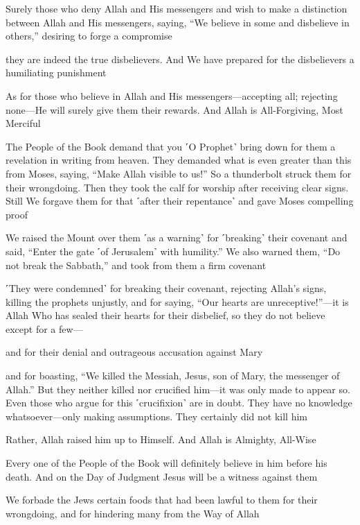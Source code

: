 Surely those who deny Allah and His messengers and wish to make a distinction between Allah and His messengers, saying, “We believe in some and disbelieve in others,” desiring to forge a compromise

they are indeed the true disbelievers. And We have prepared for the disbelievers a humiliating punishment

As for those who believe in Allah and His messengers—accepting all; rejecting none—He will surely give them their rewards. And Allah is All-Forgiving, Most Merciful

The People of the Book demand that you ˹O Prophet˺ bring down for them a revelation in writing from heaven. They demanded what is even greater than this from Moses, saying, “Make Allah visible to us!” So a thunderbolt struck them for their wrongdoing. Then they took the calf for worship after receiving clear signs. Still We forgave them for that ˹after their repentance˺ and gave Moses compelling proof

We raised the Mount over them ˹as a warning˺ for ˹breaking˺ their covenant and said, “Enter the gate ˹of Jerusalem˺ with humility.” We also warned them, “Do not break the Sabbath,” and took from them a firm covenant

˹They were condemned˺ for breaking their covenant, rejecting Allah’s signs, killing the prophets unjustly, and for saying, “Our hearts are unreceptive!”—it is Allah Who has sealed their hearts for their disbelief, so they do not believe except for a few—

and for their denial and outrageous accusation against Mary

and for boasting, “We killed the Messiah, Jesus, son of Mary, the messenger of Allah.” But they neither killed nor crucified him—it was only made to appear so. Even those who argue for this ˹crucifixion˺ are in doubt. They have no knowledge whatsoever—only making assumptions. They certainly did not kill him

Rather, Allah raised him up to Himself. And Allah is Almighty, All-Wise

Every one of the People of the Book will definitely believe in him before his death. And on the Day of Judgment Jesus will be a witness against them

We forbade the Jews certain foods that had been lawful to them for their wrongdoing, and for hindering many from the Way of Allah

